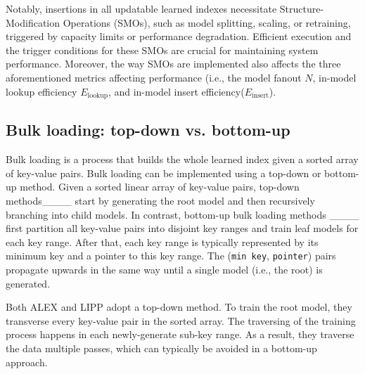 Notably, insertions in all updatable learned indexes necessitate Structure-Modification Operations (SMOs), such as model splitting, scaling, or retraining, triggered by capacity limits or performance degradation. Efficient execution and the trigger conditions for these SMOs are crucial for maintaining system performance. Moreover, the way SMOs are implemented also affects the three aforementioned metrics affecting performance (i.e., the model fanout $N$, in-model lookup efficiency $E_{\text{lookup}}$, and in-model insert efficiency($E_{\text{insert}}$).\


\subsection{Bulk loading: top-down vs. bottom-up}
Bulk loading is a process that builds the whole learned index given a sorted array of key-value pairs. %
Bulk loading can be implemented using a top-down or bottom-up method. Given a sorted linear array of key-value pairs, top-down methods____ start by generating the root model and then recursively branching into child models. In contrast, bottom-up bulk loading methods ____ first partition all key-value pairs into disjoint key ranges and train leaf models for each key range. After that, each key range is typically represented by its minimum key and a pointer to this key range. The (\texttt{min key}, \texttt{pointer}) pairs propagate upwards in the same way until a single model (i.e., the root) is generated.

Both ALEX and LIPP adopt a top-down method. To train the root model, they transverse every key-value pair in the sorted array. The traversing of the training process happens in each newly-generate sub-key range. As a result, they traverse the data multiple passes, which can typically be avoided in a bottom-up approach.

